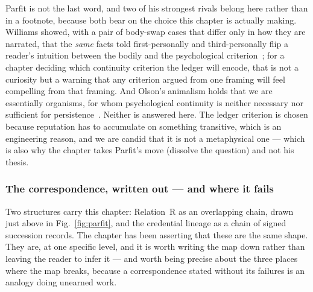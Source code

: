 \documentclass[11pt,a4paper]{article}
\theoremstyle{definition}
\begin{document}



Parfit is not the last word, and two of his strongest rivals belong here rather
than in a footnote, because both bear on the choice this chapter is actually
making. Williams showed, with a pair of body-swap cases that differ only in
how they are narrated, that the \emph{same} facts told first-personally and
third-personally flip a reader's intuition between the bodily and the
psychological criterion~; for a chapter deciding which
continuity criterion the ledger will encode, that is not a curiosity but a
warning that any criterion argued from one framing will feel compelling from
that framing. And Olson's animalism holds that we are essentially organisms,
for whom psychological continuity is neither necessary nor sufficient for
persistence~. Neither is answered here. The ledger criterion
is chosen because reputation has to accumulate on something transitive, which
is an engineering reason, and we are candid that it is not a metaphysical one
--- which is also why the chapter takes Parfit's move (dissolve the question)
and not his thesis.

\subsubsection{The correspondence, written out --- and where it
fails}\label{sec:parfit-lineage-map}

Two structures carry this chapter: Relation~R as an overlapping chain, drawn
just above in Fig.~\ref{fig:parfit}, and the credential lineage as a chain of
signed succession records. The chapter
has been asserting that these are the same shape. They are, at one specific
level, and it is worth
writing the map down rather than leaving the reader to infer it --- and worth
being precise about the three places where the map breaks, because a
correspondence stated without its failures is an analogy doing unearned work.
\end{document}
